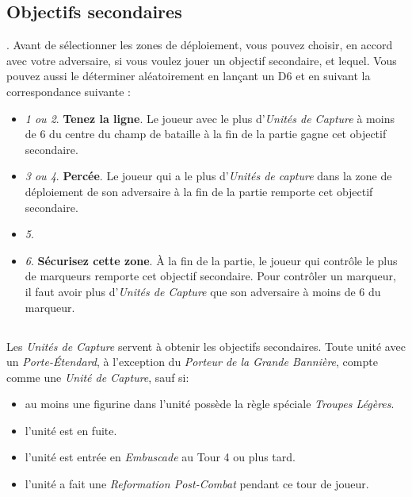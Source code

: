 \subsection{Objectifs secondaires}

. Avant de sélectionner les zones de déploiement, vous pouvez choisir, en accord avec votre adversaire, si vous voulez jouer un objectif secondaire, et lequel. Vous pouvez aussi le déterminer aléatoirement en lançant un D6 et en suivant la correspondance suivante :
\begin{itemize}
\item \emph{1 ou 2}. \textbf{Tenez la ligne}. Le joueur avec le plus d'\emph{Unités de Capture} à moins de 6{\pouce} du centre du champ de bataille à la fin de la partie gagne cet objectif secondaire.
\item \emph{3 ou 4}. \textbf{Percée}. Le joueur qui a le plus d'\emph{Unités de capture} dans la zone de déploiement de son adversaire à la fin de la partie remporte cet objectif secondaire.
\item \emph{5}. 
\item \emph{6}. \textbf{Sécurisez cette zone}. À la fin de la partie, le joueur qui contrôle le plus de marqueurs remporte cet objectif secondaire. Pour contrôler un marqueur, il faut avoir plus d'\emph{Unités de Capture} que son adversaire à moins de 6{\pouce} du marqueur. 
\end{itemize}

\subsection{}

Les \emph{Unités de Capture} servent à obtenir les objectifs secondaires. Toute unité avec un \emph{Porte-Étendard}, à l'exception du \emph{Porteur de la Grande Bannière}, compte comme une \emph{Unité de Capture}, sauf si:
\begin{itemize}
\item au moins une figurine dans l'unité possède la règle spéciale \emph{Troupes Légères}.
\item l'unité est en fuite.
\item l'unité est entrée en \emph{Embuscade} au Tour 4 ou plus tard.
\item l'unité a fait une \emph{Reformation Post-Combat} pendant ce tour de joueur.
\end{itemize}


